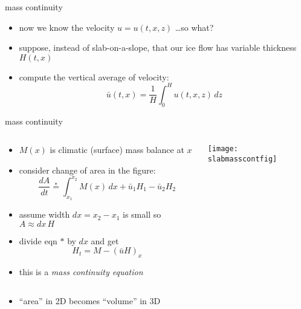 \begin{frame}{mass continuity}

\begin{itemize}
\item now we know the velocity $u=u(t,x,z)$ \dots so what?
\item suppose, instead of slab-on-a-slope, that our ice flow has \alert{variable thickness} $H(t,x)$
\item compute the vertical average of velocity:
	$$\bar u(t,x) = \frac{1}{H}\int_0^{H} u(t,x,z)\,dz$$
\end{itemize}
\end{frame}


\begin{frame}{mass continuity }

\begin{columns}
\begin{column}{0.6\textwidth}
\small
\begin{itemize}
\item $M(x)$ is climatic (surface) mass balance at $x$
\item consider change of area in the figure:
	$$\frac{dA}{dt} \stackrel{\ast}{=} \int_{x_1}^{x_2} M(x)\,dx + \bar u_1 H_1 - \bar u_2 H_2$$
\item assume width $dx=x_2-x_1$ is small so $A\approx dx\, H$
\item divide eqn $\ast$ by $dx$ and get
   $$H_t = M - \left(\bar u H\right)_x$$
\item this is a \emph{mass continuity equation}
\end{itemize}
\end{column}
\begin{column}{0.4\textwidth}
\texttt{[image: slabmasscontfig]}
\end{column}
\end{columns}

\bigskip
\small
\begin{itemize}
\item ``area'' in 2D becomes ``volume'' in 3D
\end{itemize}
\end{frame}


